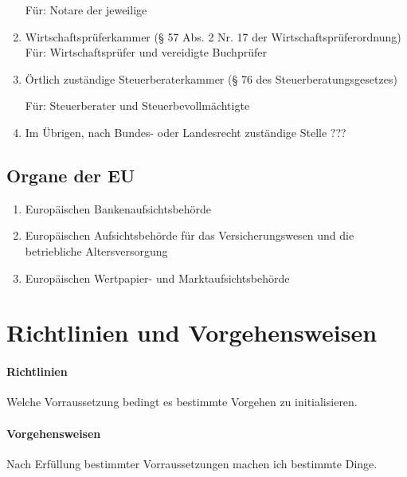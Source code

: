\documentclass{article}
\begin{document}
\begin{enumerate}
                    Für: Notare der jeweilige 

                \item Wirtschaftsprüferkammer (§ 57 Abs. 2 Nr. 17 der Wirtschaftsprüferordnung)
                Für: Wirtschaftsprüfer und vereidigte Buchprüfer

                \item Örtlich zuständige Steuerberaterkammer (§ 76 des Steuerberatungsgesetzes)

                    Für: Steuerberater und Steuerbevollmächtigte

                \item Im Übrigen, nach Bundes- oder Landesrecht zuständige Stelle ???

            \end{enumerate}

        \subsection[Organe EU]{Organe der EU}

            \begin{enumerate}

                \item Europäischen Bankenaufsichtsbehörde 

                \item Europäischen Aufsichtsbehörde für das Versicherungswesen und die betriebliche Altersversorgung 

                \item Europäischen Wertpapier- und Marktaufsichtsbehörde 

            \end{enumerate}        


    \section[Richtlinien und Vorgehensweisen]{Richtlinien und Vorgehensweisen}

        \paragraph[Richtlinien]{Richtlinien}
            Welche Vorraussetzung bedingt es bestimmte Vorgehen zu initialisieren.

        \paragraph[Vorgehensweisen]{Vorgehensweisen}
            Nach Erfüllung bestimmter Vorraussetzungen machen ich bestimmte Dinge.
\end{document}
